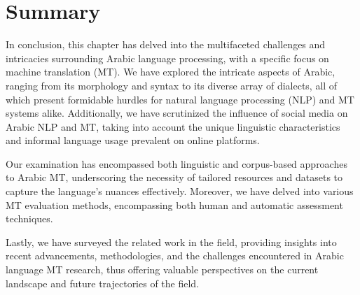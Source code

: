 \section{Summary}
In conclusion, this chapter has delved into the multifaceted challenges and intricacies surrounding Arabic language processing, with a specific focus on machine translation (MT).
We have explored the intricate aspects of Arabic, ranging from its morphology and syntax to its diverse array of dialects, all of which present formidable hurdles for natural language processing (NLP) and MT systems alike. 
Additionally, we have scrutinized the influence of social media on Arabic NLP and MT, taking into account the unique linguistic characteristics and informal language usage prevalent on online platforms. 
 
Our examination has encompassed both linguistic and corpus-based approaches to Arabic MT, underscoring the necessity of tailored resources and datasets to capture the language's nuances effectively. 
Moreover, we have delved into various MT evaluation methods, encompassing both human and automatic assessment techniques. 
 
Lastly, we have surveyed the related work in the field, providing insights into recent advancements, methodologies, and the challenges encountered in Arabic language MT research, thus offering valuable perspectives on the current landscape and future trajectories of the field.